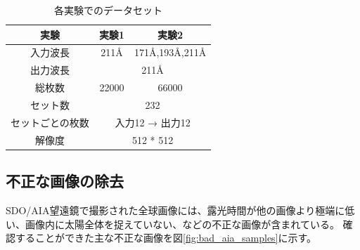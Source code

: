 \begin{table}[h]
    \centering
    \begin{tabular}{|c|c|c|}
    \hline
    実験 & 実験1 & 実験2 \\
    \hline\hline
    入力波長 & 211Å & 171Å,193Å,211Å \\
    \hline
    出力波長 & \multicolumn{2}{c|}{211Å} \\
    \hline
    総枚数 & 22000 & 66000 \\
    \hline
    セット数 & \multicolumn{2}{c|}{232} \\
    \hline
    セットごとの枚数 & \multicolumn{2}{c|}{入力12 → 出力12} \\
    \hline
    解像度 & \multicolumn{2}{c|}{512 * 512} \\
    \hline
    \end{tabular}
    \caption{各実験でのデータセット}
    \label{tab:my_label}
\end{table}

\subsection{不正な画像の除去}
SDO/AIA望遠鏡で撮影された全球画像には、露光時間が他の画像より極端に低い、画像内に太陽全体を捉えていない、などの不正な画像が含まれている。
確認することができた主な不正な画像を図\ref{fig:bad_aia_samples}に示す。

